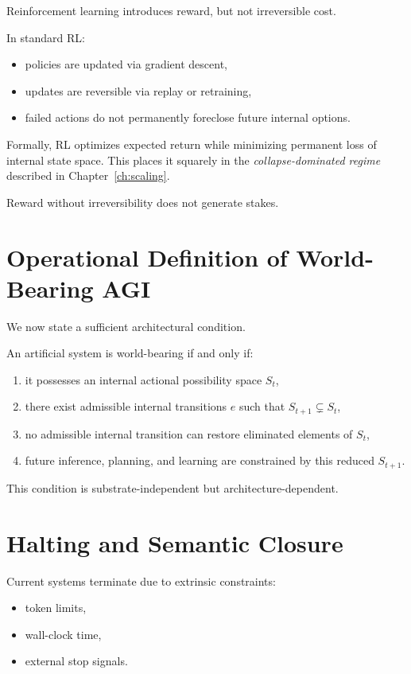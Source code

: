 \documentclass[11pt]{book}
\begin{document}
Reinforcement learning introduces reward, but not irreversible cost.

In standard RL:
\begin{itemize}
\item policies are updated via gradient descent,
\item updates are reversible via replay or retraining,
\item failed actions do not permanently foreclose future internal options.
\end{itemize}

Formally, RL optimizes expected return while minimizing permanent loss
of internal state space. This places it squarely in the
\emph{collapse-dominated regime} described in Chapter~\ref{ch:scaling}.

Reward without irreversibility does not generate stakes.

\section{Operational Definition of World-Bearing AGI}

We now state a sufficient architectural condition.

\begin{definition}
An artificial system is world-bearing if and only if:
\begin{enumerate}
\item it possesses an internal actional possibility space $S_t$,
\item there exist admissible internal transitions $e$ such that
$S_{t+1} \subsetneq S_t$,
\item no admissible internal transition can restore eliminated elements of
$S_t$,
\item future inference, planning, and learning are constrained by this
reduced $S_{t+1}$.
\end{enumerate}
\end{definition}

This condition is substrate-independent but architecture-dependent.

\section{Halting and Semantic Closure}

Current systems terminate due to extrinsic constraints:
\begin{itemize}
\item token limits,
\item wall-clock time,
\item external stop signals.
\end{itemize}
\end{document}
